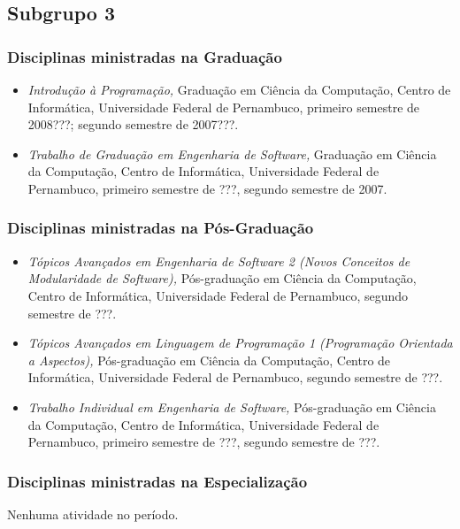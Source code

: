 \subsection{Subgrupo 3}

\subsubsection{Disciplinas ministradas na Graduação}
\begin{itemize}
\item \emph{Introdução à Programação,} Graduação em
      Ciência da Computação, Centro de Informática, 
      Universidade Federal de Pernambuco, primeiro semestre de 
      2008???; segundo semestre de 
      2007???.   
\item {\em Trabalho de Graduação em Engenharia de Software,} Graduação em Ciência da Computação, Centro de Informática, Universidade Federal de Pernambuco, primeiro semestre de ???, segundo semestre de 2007.  
\end{itemize}


\subsubsection{Disciplinas ministradas na Pós-Graduação}
\begin{itemize} 
 \item \emph{Tópicos Avançados em Engenharia de Software 2 (Novos  
       Conceitos de Modularidade de Software),} 
       Pós-graduação em Ciência da Computação, Centro de 
       Informática, Universidade Federal de Pernambuco, segundo 
       semestre de ???.  
 \item \emph{Tópicos Avançados em Linguagem de Programação 1
       (Programação Orientada a Aspectos),}   
       Pós-graduação em Ciência da Computação, Centro de 
       Informática, Universidade Federal de Pernambuco, segundo 
       semestre de ???.  
 \item \emph{Trabalho Individual em Engenharia de Software,}
       Pós-graduação em Ciência da Computação, Centro de 
       Informática, Universidade Federal de Pernambuco, primeiro 
       semestre de ???, segundo semestre de ???.  
\end{itemize}


\subsubsection{Disciplinas ministradas na Especialização}

Nenhuma atividade no período.

